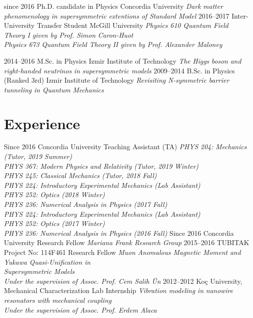 \documentclass[]{friggeri-cv}
\begin{document}
\begin{entrylist}
  \entry
    {since 2016}
    {Ph.D. candidate in Physics}
    {Concordia University}
    {\emph{Dark matter phenomenology in supersymmetric extentions of Standard Model}}
   \entry
   {2016--2017}
   {Inter-University Transfer Student}
   {McGill University}
   {\emph{Physics 610 Quantum Field Theory I given by Prof. Simon Caron-Huot \\
      Physics 673 Quantum Field Theory II given by Prof. Alexander Maloney }}
   
  \entry
    {2014–2016}
    {M.Sc. in Physics}
    {Izmir Institute of Technology}
    {\emph{The Higgs boson and right-handed neutrinos in supersymmetric models}}
  \entry
    {2009–2014}
    {B.Sc. in Physics (Ranked 3rd)}
    {Izmir Institute of Technology}
    {\emph{Revisiting N-symmetric barrier tunneling in Quantum Mechanics}}
    

\end{entrylist}

\section{Experience}

\begin{entrylist}
  \entry
    {Since 2016}
    {Concordia University}
    {Teaching Assistant (TA)}
    {\emph{
    PHYS 204: Mechanics (Tutor, 2019 Summer) \\    		
    PHYS 367: Modern Physics and Relativity (Tutor, 2019 Winter) \\		
    PHYS 245: Classical Mechanics (Tutor, 2018 Fall) \\
	PHYS 224: Introductory Experimental Mechanics (Lab Assistant) \\    		
    PHYS 252: Optics (2018 Winter) \\ 
	PHYS 236: Numerical Analysis in Physics (2017 Fall) \\
	PHYS 224: Introductory Experimental Mechanics (Lab Assistant) \\
	PHYS 252: Optics (2017 Winter) \\
	PHYS 236: Numerical Analysis in Physics (2016 Fall)
	}}
  \entry
    {Since 2016}
    {Concordia University}
    {Research Fellow}
    {\emph{Mariana Frank Research Group}}
  \entry
    {2015--2016}
    {TUBITAK Project No: 114F461}
    {Research Fellow}
    {\emph{Muon Anomalous Magnetic Moment and Yukawa Quasi-Unification in \\ Supersymmetric Models \\
    		Under the supervision of Assoc. Prof. Cem Salih Ün}}  
  \entry
  	{2012--2012}
  	{Koç University, Mechanical Characterization Lab}
  	{Internship}
  	{\emph{Vibration modeling in nanowire resonators with mechanical coupling \\
  	 Under the supervision of Assoc. Prof. Erdem Alaca}}  
\end{entrylist}
\end{document}
